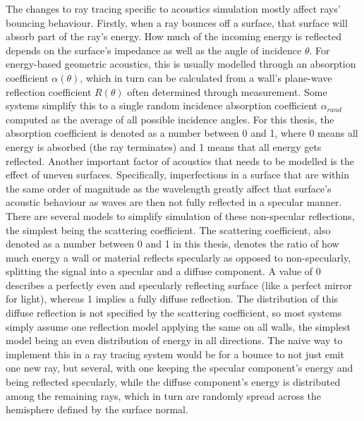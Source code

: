 The changes to ray tracing specific to acoustics simulation mostly affect rays' bouncing behaviour.
Firstly, when a ray bounces off a surface,
that surface will absorb part of the ray's energy.
How much of the incoming energy is reflected depends on the surface's impedance
as well as the angle of incidence \(\theta\).
\newline
For energy-based geometric acoustics, this is usually modelled through an absorption coefficient \(\alpha(\theta)\),
which in turn can be calculated from a wall's plane-wave reflection coefficient \(R(\theta)\) often determined through measurement.
Some systems simplify this to a single random incidence absorption coefficient \(\alpha_{rand}\)
computed as the average of all possible incidence angles.
For this thesis, the absorption coefficient is denoted as a number between 0 and 1,
where 0 means all energy is absorbed (the ray terminates) and 1 means that all energy gets reflected.
\newline
Another important factor of acoustics that needs to be modelled is the effect of uneven surfaces.
Specifically, imperfections in a surface that are within the same order of magnitude as the wavelength greatly affect that surface's acoustic behaviour
as waves are then not fully reflected in a specular manner.
There are several models to simplify simulation of these non-specular reflections,
the simplest being the scattering coefficient.
\newline
The scattering coefficient, also denoted as a number between 0 and 1 in this thesis,
denotes the ratio of how much energy a wall or material reflects specularly as opposed to non-specularly,
splitting the signal into a specular and a diffuse component.
A value of 0 describes a perfectly even and specularly reflecting surface (like a perfect mirror for light),
whereas 1 implies a fully diffuse reflection.
\newline
The distribution of this diffuse reflection is not specified by the scattering coefficient,
so most systems simply assume one reflection model applying the same on all walls,
the simplest model being an even distribution of energy in all directions.
\newline
The naive way to implement this in a ray tracing system would be for a bounce to not just emit one new ray, but several,
with one keeping the specular component's energy and being reflected specularly,
while the diffuse component's energy is distributed among the remaining rays,
which in turn are randomly spread across the hemisphere defined by the surface normal.
